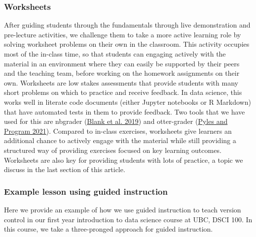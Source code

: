 \documentclass[
  12 pt,
]{paper}
\begin{document}
\hypertarget{worksheets}{%
\subsubsection{Worksheets}\label{worksheets}}

After guiding students through the fundamentals
through live demonstration and pre-lecture activities,
we challenge them to take a more active learning role
by solving worksheet problems on their own in the classroom.
This activity occupies most of the in-class time,
so that students can engaging actively with the material
in an environment where they can easily be supported
by their peers and the teaching team,
before working on the homework assignments on their own.
Worksheets are low stakes assessments that
provide students with many short problems on which to practice and receive feedback.
In data science,
this works well in literate code documents
(either Jupyter notebooks or R Markdown)
that have automated tests in them to provide feedback.
Two tools that we have used for this are nbgrader (\protect\hyperlink{ref-blank2019nbgrader}{Blank et al. 2019})
and otter-grader (\protect\hyperlink{ref-otter}{Pyles and Program 2021}).
Compared to in-class exercises,
worksheets give learners an additional chance to actively engage with the material
while still providing a structured way of providing exercises
focused on key learning outcomes.
Worksheets are also key for providing students with lots of practice,
a topic we discuss in the last section of this article.

\hypertarget{example-lesson-using-guided-instruction}{%
\subsubsection{Example lesson using guided instruction}\label{example-lesson-using-guided-instruction}}

Here we provide an example of how we use guided instruction to teach version
control in our first year introduction to data science course at UBC, DSCI 100.
In this course, we take a three-pronged approach for guided instruction.
\end{document}
